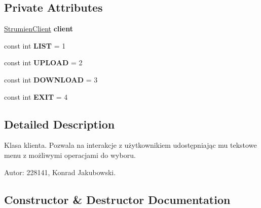 \subsection*{Private Attributes}
\begin{DoxyCompactItemize}
\item 
\mbox{\label{class_wcf_stream_service_client_1_1_client_ad9b590e2d4ba3356526232e9d86c318a}} 
\hyperlink{class_wcf_stream_service_client_1_1_service_reference1_1_1_strumien_client}{Strumien\+Client} {\bfseries client}
\item 
\mbox{\label{class_wcf_stream_service_client_1_1_client_a000e88dc48020575a0072091a0be660d}} 
const int {\bfseries L\+I\+ST} = 1
\item 
\mbox{\label{class_wcf_stream_service_client_1_1_client_a163a28cc3a4108d0d0f1d7dc6022f4d8}} 
const int {\bfseries U\+P\+L\+O\+AD} = 2
\item 
\mbox{\label{class_wcf_stream_service_client_1_1_client_ae950b7cba78d1a7cec3db7a12d4a7240}} 
const int {\bfseries D\+O\+W\+N\+L\+O\+AD} = 3
\item 
\mbox{\label{class_wcf_stream_service_client_1_1_client_a3a259b6d798de8d4a297d2bf4908a3e3}} 
const int {\bfseries E\+X\+IT} = 4
\end{DoxyCompactItemize}


\subsection{Detailed Description}
Klasa klienta. Pozwala na interakcje z użytkownikiem udostępniając mu tekstowe menu z możliwymi operacjami do wyboru. 

Autor\+: 228141, Konrad Jakubowski. 

\subsection{Constructor \& Destructor Documentation}
\mbox{\label{class_wcf_stream_service_client_1_1_client_a04a60e2a76ab51077d00c0219e4ffc3e}} 
